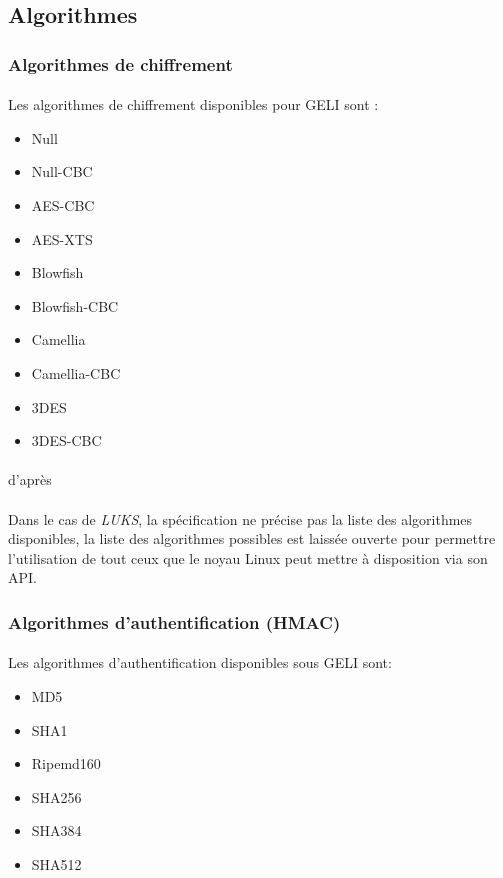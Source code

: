 \subsection{Algorithmes}
\subsubsection{Algorithmes de chiffrement}
\paragraph{}
Les algorithmes de chiffrement disponibles pour GELI sont :
\begin{itemize}
	\item Null
	\item Null-CBC
	\item AES-CBC
	\item AES-XTS
	\item Blowfish
	\item Blowfish-CBC
	\item Camellia
	\item Camellia-CBC
	\item 3DES
	\item 3DES-CBC
\end{itemize}

\paragraph{}
d'après \cite{geli.h}

\paragraph{}
Dans le cas de {\em LUKS}, la spécification \cite{onDiskFormatLuks}
ne précise pas la liste des algorithmes disponibles, la liste des algorithmes 
possibles est laissée ouverte pour permettre l'utilisation de tout ceux que le 
noyau Linux peut mettre à disposition via son API.

\subsubsection{Algorithmes d'authentification (HMAC)}
\paragraph{}
Les algorithmes d'authentification disponibles sous GELI sont:
\begin{itemize}
	\item MD5
	\item SHA1
	\item Ripemd160
	\item SHA256
	\item SHA384
	\item SHA512
\end{itemize}

